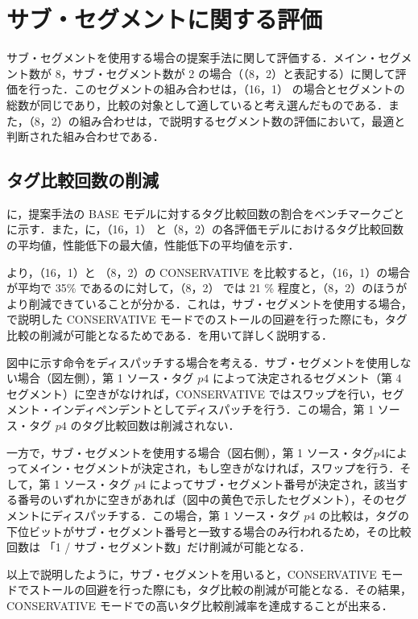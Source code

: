 \section{サブ・セグメントに関する評価}
\label{sec:eval_subseg}
サブ・セグメントを使用する場合の提案手法に関して評価する．メイン・セグメント数が 8，サブ・セグメント数が 2 の場合（（8，2）と表記する）に関して評価を行った．このセグメントの組み合わせは，（16，1） の場合とセグメントの総数が同じであり，比較の対象として適していると考え選んだものである．また，（8，2）の組み合わせは，で説明するセグメント数の評価において，最適と判断された組み合わせである．


\subsection{タグ比較回数の削減}
に，提案手法の BASE モデルに対するタグ比較回数の割合をベンチマークごとに示す．また，に，（16，1） と（8，2）の各評価モデルにおけるタグ比較回数の平均値，性能低下の最大値，性能低下の平均値を示す．

 より，（16，1）と （8，2）の CONSERVATIVE を比較すると，（16，1）の場合が平均で 35\% であるのに対して，（8，2） では 21 \% 程度と，（8，2）のほうがより削減できていることが分かる．これは，サブ・セグメントを使用する場合，で説明した CONSERVATIVE モードでのストールの回避を行った際にも，タグ比較の削減が可能となるためである．を用いて詳しく説明する．

図中に示す命令をディスパッチする場合を考える．サブ・セグメントを使用しない場合（図左側），第 1 ソース・タグ $p4$ によって決定されるセグメント（第 4 セグメント）に空きがなければ，CONSERVATIVE ではスワップを行い，セグメント・インディペンデントとしてディスパッチを行う．この場合，第 1 ソース・タグ $p4$ のタグ比較回数は削減されない．

一方で，サブ・セグメントを使用する場合（図右側），第 1 ソース・タグ$p4$によってメイン・セグメントが決定され，もし空きがなければ，スワップを行う．そして，第 1 ソース・タグ $p4$ によってサブ・セグメント番号が決定され，該当する番号のいずれかに空きがあれば（図中の黄色で示したセグメント），そのセグメントにディスパッチする．この場合，第 1 ソース・タグ $p4$ の比較は，タグの下位ビットがサブ・セグメント番号と一致する場合のみ行われるため，その比較回数は 「1 / サブ・セグメント数」だけ削減が可能となる．

以上で説明したように，サブ・セグメントを用いると，CONSERVATIVE モードでストールの回避を行った際にも，タグ比較の削減が可能となる．その結果，CONSERVATIVE モードでの高いタグ比較削減率を達成することが出来る．

